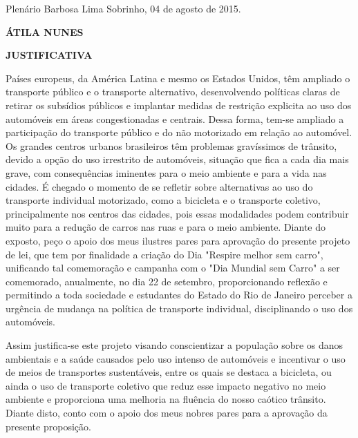 \documentclass[10pt]{article}
\begin{document}
\begin{center}
  Plenário Barbosa Lima Sobrinho, 04 de agosto de 2015.

   \bigskip

  \textbf{ ÁTILA NUNES}

  \bigskip

  \textbf{JUSTIFICATIVA}
  \bigskip

\end{center}

  Países europeus, da América Latina e mesmo os Estados Unidos, têm ampliado o transporte público e o transporte alternativo, desenvolvendo políticas claras de retirar os subsídios públicos e implantar medidas de restrição explicita ao uso dos automóveis em áreas congestionadas e centrais. Dessa forma, tem-se ampliado a participação do transporte público e do não motorizado em relação ao automóvel.    Os grandes centros urbanos brasileiros têm problemas gravíssimos de trânsito, devido a opção do uso irrestrito de automóveis, situação que fica a cada dia mais grave, com consequências iminentes para o meio ambiente e para a vida nas cidades.
É chegado o momento de se refletir sobre alternativas ao uso do transporte individual motorizado, como a bicicleta e o transporte coletivo, principalmente nos centros das cidades, pois essas modalidades podem contribuir muito para a redução de carros nas ruas e para o meio ambiente.  Diante do exposto, peço o apoio dos meus ilustres pares para aprovação do presente projeto de lei, que tem por finalidade a criação do Dia "Respire melhor sem carro", unificando tal comemoração e campanha com o "Dia Mundial sem Carro" a ser comemorado, anualmente, no dia 22 de setembro, proporcionando reflexão e permitindo a toda sociedade e estudantes do Estado do Rio de Janeiro perceber a urgência de mudança na política de transporte individual, disciplinando o uso dos automóveis.

Assim justifica-se este projeto visando conscientizar a população sobre os danos ambientais e a saúde causados pelo uso intenso de automóveis e incentivar o uso de meios de transportes sustentáveis, entre os quais se destaca a bicicleta, ou ainda o uso de transporte coletivo que reduz esse impacto negativo no meio ambiente e proporciona uma melhoria na fluência do nosso caótico trânsito.   Diante disto, conto com o apoio dos meus nobres pares para a aprovação da presente proposição.




\iffalse
\begin{center}
  \textbf{REFERÊNCIAS}
\end{center}


\fi
\end{document}
